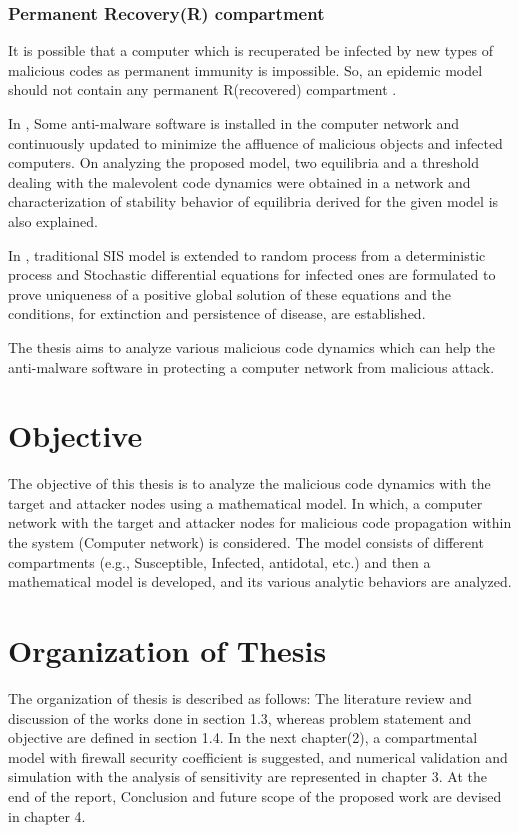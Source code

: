 \subsubsection{Permanent Recovery(R) compartment}
It is possible that a computer which is recuperated be infected by new types of malicious codes as permanent immunity is impossible. So, an epidemic model should
not contain any permanent R(recovered) compartment \cite{edtr15,edtr6}.
\par In \cite{edtr12}, Some anti-malware software is installed in the computer network and continuously updated to minimize the affluence of malicious objects and infected
computers. On analyzing the proposed model, two equilibria and a threshold dealing with the malevolent code dynamics were obtained in a network and
characterization of stability behavior of equilibria derived for the given model is also explained.
\par In \cite{edtr17}, traditional SIS model is extended to random process from a deterministic process and Stochastic differential equations for infected ones are formulated to prove uniqueness of a positive global solution of these equations and the conditions, for extinction and persistence of disease, are established.
\par The thesis aims to analyze various malicious code dynamics which can
 help the anti-malware software in protecting a computer network from malicious attack.
\section{Objective}
The objective of this thesis is to analyze the malicious code dynamics with the target and attacker nodes using a mathematical model. In which, a computer network with
 the target and attacker nodes for malicious code propagation within the system (Computer network) is considered. The model consists of different compartments
 (e.g., Susceptible, Infected, antidotal, etc.) and then a mathematical model is developed, and its various analytic behaviors are analyzed.

\section{Organization of Thesis}
The organization of thesis is described as follows: The literature review and discussion
of the works done in section 1.3, whereas problem statement and
objective are defined in section 1.4. In the next chapter(2), a compartmental model with firewall
security coefficient is suggested, and numerical validation and simulation with the analysis of sensitivity are represented in chapter 3. At the end of the report, Conclusion and future scope of
the proposed work are devised in chapter 4.
